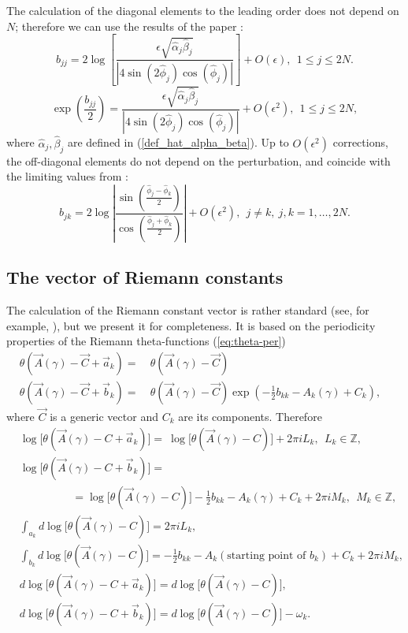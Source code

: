 \documentclass[12pt]{article}
\newcommand{\ZZ}{{\mathbb Z}}
\begin{document}
The calculation of the diagonal elements to the leading order does not depend on $N$; therefore we can use the results of the paper \cite{GS1}:
\begin{equation}
\label{eq:riemann2}
b_{jj}= 2 \log\left[ \frac{\epsilon\sqrt{\hat\alpha_j\hat\beta_j}}{|4\sin(2\hat\phi_j) \cos(\hat\phi_j)|} \right]+O(\epsilon), \ \ 1\le j \le 2N.
\end{equation}
$$
\exp{\left(\frac{b_{jj}}{2}\right)}=
\frac{\epsilon\sqrt{\hat\alpha_j\hat\beta_j}}{|4\sin(2\hat\phi_j) \cos(\hat\phi_j)|}+O(\epsilon^2), \ \ 1\le j \le 2N,
$$
where $\hat\alpha_j,\hat\beta_j$ are defined in (\ref{def_hat_alpha_beta}). 
Up to $O(\epsilon^2)$ corrections, the off-diagonal elements do not depend on the perturbation, and coincide with the limiting values from \cite{ItsRybinSall}:
\begin{equation}
\label{eq:b_off_diag}
b_{jk} = 2\log \left|\frac{\sin\left(\frac{\hat\phi_j-\hat\phi_k}{2} \right)}{\cos\left(\frac{\hat\phi_j+\hat\phi_k}{2} \right) }\right| +O(\epsilon^2) , \ \ j\ne k, \ j,k=1,\ldots,2N.
\end{equation}

\subsection{The vector of Riemann constants}
\label{sec:sec5.2}

The calculation of the Riemann constant vector is rather standard (see, for example, \cite{Dubrovin2}), but we present it for completeness. It is based on the periodicity properties of the Riemann theta-functions (\ref{eq:theta-per})
\begin{align}
\theta(\vec A(\gamma)-{\vec C} + \vec a_k)  =  &\ \theta(\vec A(\gamma)-\vec C)&\\
\theta(\vec A(\gamma)-{\vec C} + \vec b_k)  =  &\ \theta(\vec A(\gamma)-\vec C)\exp\left(-\frac{1}{2}b_{kk}- A_k(\gamma) + C_k\right),&
\end{align}
where $\vec C$ is a generic vector and $C_k$ are its components. Therefore
\begin{equation}
\begin{split}
&\log\big[\theta(\vec A(\gamma)-C + \vec a_k) \big]  =  \ \log\big[\theta(\vec A(\gamma)-C)\big] + 2\pi i L_k, \ \  L_k\in \ZZ, \\
&\log\big[\theta(\vec A(\gamma)-C + \vec b_k)\big]   =  \\
&\hspace{2cm}= \log\big[\theta(\vec A(\gamma)-C)] -\frac{1}{2} b_{kk}- A_k(\gamma) + C_k + 2\pi i M_k, \ \ M_k\in \ZZ,\\
&\int_{a_k}d\log\big[\theta(\vec A(\gamma)-C) \big]= 2\pi i L_k,\\
&\int_{b_k}d\log\big[\theta(\vec A(\gamma)-C) \big]= -\frac{1}{2} b_{kk}- A_k(\mbox{starting point of }b_k) + C_k + 2\pi i M_k,\\
&d\log\big[\theta(\vec A(\gamma)-C+\vec a_k) \big] =d\log\big[\theta(\vec A(\gamma)-C) \big],\\
&d\log\big[\theta(\vec A(\gamma)-C+\vec b_k) \big] =d\log\big[\theta(\vec A(\gamma)-C) \big]- \omega_k.
\end{split}
\end{equation}
\end{document}
